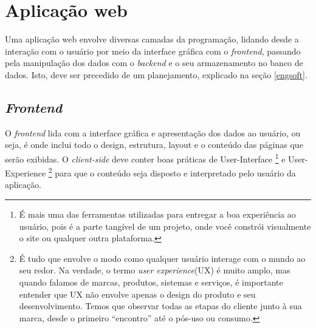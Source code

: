 
\section{Aplicação web}
Uma aplicação web envolve diversas camadas da programação, lidando desde a interação com o usuário por meio da interface gráfica com o \textit{frontend}, passando pela manipulação dos dados com o \textit{backend} e o seu armazenamento no banco de dados. Isto, deve ser precedido de um planejamento, explicado na seção \ref{engsoft}.

\subsection{\textit{Frontend}}
O \textit{frontend} lida com a interface gráfica e apresentação dos dados ao usuário, ou seja, é onde inclui todo o design, estrutura, layout e o conteúdo das páginas que serão exibidas. O \textit{client-side} deve conter boas práticas de User-Interface
\footnote{É mais uma das ferramentas utilizadas para entregar a boa experiência ao usuário, pois é a parte tangível de um projeto, onde você constrói visualmente o site ou qualquer outra plataforma.}
e User-Experience
\footnote{É tudo que envolve o modo como qualquer usuário interage com o mundo ao seu redor. Na verdade, o termo \textit{user experience}(UX) é muito amplo, mas quando falamos de marcas, produtos, sistemas e serviços, é importante entender que UX não envolve apenas o design do produto e seu desenvolvimento. Temos que observar todas as etapas do cliente junto à sua marca, desde o primeiro “encontro” até o pós-uso ou consumo.} 
para que o conteúdo seja disposto e interpretado pelo usuário da aplicação. \cite{SOUTO}

